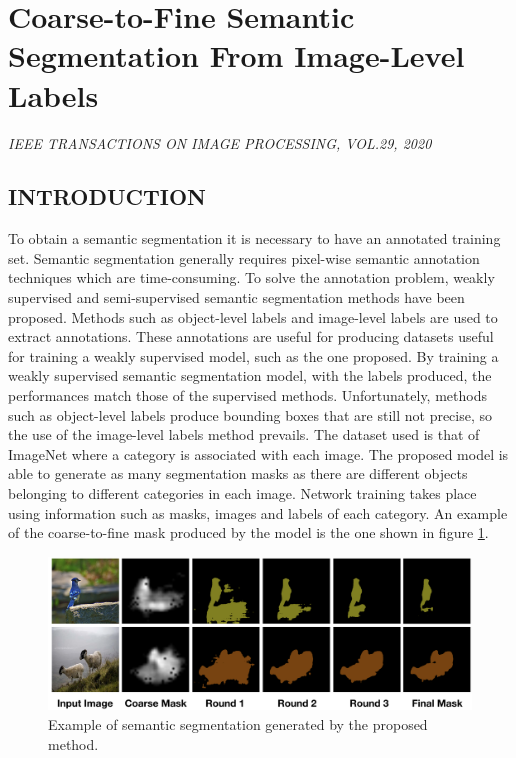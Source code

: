 \section{Coarse-to-Fine Semantic Segmentation From Image-Level Labels}

\begin{flushleft}
    \author{
    Longlong Jing,
    Yucheng Chen,
    Yingli Tan,
    \emph{Fellow, IEEE}
    }
\end{flushleft}

\begin{center}
    \emph{IEEE TRANSACTIONS ON IMAGE PROCESSING, VOL.29, 2020}
\end{center}

\subsection{INTRODUCTION}
To obtain a semantic segmentation it is necessary to have an annotated 
training set. Semantic segmentation generally requires pixel-wise semantic 
annotation techniques which are time-consuming. To solve the annotation 
problem, weakly supervised and semi-supervised semantic segmentation 
methods have been proposed. Methods such as object-level labels and image-level 
labels are used to extract annotations. These annotations are useful for 
producing datasets useful for training a weakly supervised model, such as 
the one proposed. By training a weakly supervised semantic segmentation 
model, with the labels produced, the performances match those of the supervised 
methods. Unfortunately, methods such as object-level labels produce 
bounding boxes that are still not precise, so the use of the image-level labels 
method prevails. The dataset used is that of ImageNet where a category is 
associated with each image. The proposed model is able to generate as many 
segmentation masks as there are different objects belonging to different 
categories in each image. Network training takes place using information such as 
masks, images and labels of each category. An example of the coarse-to-fine 
mask produced by the model is the one shown in figure \ref{fig:semanticWork}.
\begin{figure}[h!]
    \centering
    \includegraphics[width = 1 \linewidth]{images/paper6/work.png}
    \centering
    \caption{Example of semantic segmentation generated by the proposed method.}
    \label{fig:semanticWork}
\end{figure}

